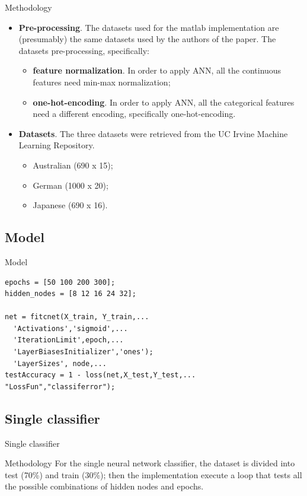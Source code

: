 \documentclass[12pt]{beamer}
\begin{document}
\begin{frame}{Methodology}
  \begin{itemize}
    \item \textbf{Pre-processing}. The datasets used for the matlab implementation
      are (presumably) the same datasets used by the authors of the paper. The datasets
      pre-processing, specifically:
      \begin{itemize}
        \item \textbf{feature normalization}. In order to apply ANN, all the continuous
          features need min-max normalization;
        \item \textbf{one-hot-encoding}. In order to apply ANN, all the categorical
          features need a different encoding, specifically one-hot-encoding.
      \end{itemize}
    \item \textbf{Datasets}. The three datasets were retrieved from the UC Irvine Machine Learning Repository.
      \begin{itemize}
        \item Australian (690 x 15);
        \item German (1000 x 20);
        \item Japanese (690 x 16).
      \end{itemize}
  \end{itemize}
\end{frame}

\subsection{Model}

\begin{frame}[fragile]{Model}
  \begin{lstlisting}[style=matlab]
epochs = [50 100 200 300];
hidden_nodes = [8 12 16 24 32];

net = fitcnet(X_train, Y_train,...
  'Activations','sigmoid',...
  'IterationLimit',epoch,...
  'LayerBiasesInitializer','ones');
  'LayerSizes', node,...
testAccuracy = 1 - loss(net,X_test,Y_test,...
"LossFun","classiferror");
  \end{lstlisting}
\end{frame}

\subsection{Single classifier}

\begin{frame}{Single classifier}
  \begin{block}{Methodology}
    For the single neural network classifier, the dataset is divided into test
    (70\%) and train (30\%); then the implementation execute a loop
    that tests all the possible combinations of hidden nodes and epochs.
  \end{block}
\end{frame}
\end{document}
